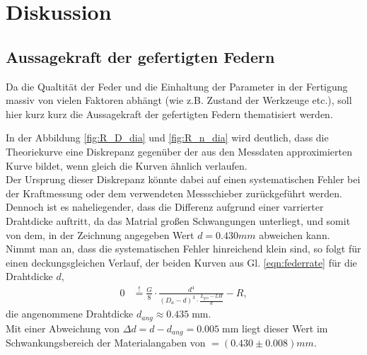 \newpage
\section{Diskussion}
\subsection{Aussagekraft der gefertigten Federn}
Da die Qualtität der Feder und die Einhaltung der Parameter in der Fertigung 
massiv von vielen Faktoren abhängt (wie z.B. Zustand der Werkzeuge etc.), soll hier kurz
kurz die Aussagekraft der gefertigten Federn thematisiert werden.\newline

In der Abbildung \ref{fig:R_D_dia} und \ref{fig:R_n_dia} wird deutlich, dass die
Theoriekurve eine Diskrepanz gegenüber der aus den Messdaten approximierten 
Kurve bildet, wenn gleich die Kurven ähnlich verlaufen.\\
Der Ursprung dieser Diskrepanz könnte dabei auf einen systematischen Fehler
bei der Kraftmessung oder dem verwendeten Messschieber zurückgeführt werden. Dennoch ist es naheliegender, dass die Differenz
aufgrund einer varrierter Drahtdicke auftritt, da das Matrial großen Schwangungen unterliegt, 
und somit von dem, in der Zeichnung angegeben Wert $d=0.430\si{mm}$ abweichen kann.\\
Nimmt man an, dass die systematischen Fehler hinreichend klein sind, so folgt für einen deckungsgleichen Verlauf, der beiden Kurven aus Gl. \ref{eqn:federrate} für die Drahtdicke $d$,
\begin{align*}
    0&\overset{\text{!}}{=}\frac{G}{8} \cdot \frac{d^4}{(D_a-d)^3\cdot \frac{L_{ges}-LH}{d}}-R,
\end{align*}
die angenommene Drahtdicke $d_{ang} \approx 0.435\;$mm.\\
Mit einer Abweichung von $\Delta d=d-d_{ang}=0.005\;$mm liegt dieser Wert im Schwankungsbereich
der Materialangaben von $=(0.430\pm 0.008)\si{mm}$.


